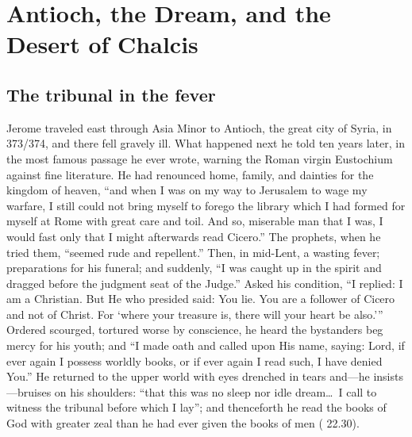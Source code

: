 \section{Antioch, the Dream, and the Desert of Chalcis}

\subsection{The tribunal in the fever}

Jerome traveled east through Asia Minor to Antioch, the great city of Syria,
in 373/374, and there fell gravely ill. What happened next he told ten years
later, in the most famous passage he ever wrote, warning the Roman virgin
Eustochium against fine literature. He had renounced home, family, and
dainties for the kingdom of heaven, ``and when I was on my way to Jerusalem to
wage my warfare, I still could not bring myself to forego the library which I
had formed for myself at Rome with great care and toil. And so, miserable man
that I was, I would fast only that I might afterwards read Cicero.'' The
prophets, when he tried them, ``seemed rude and repellent.'' Then, in
mid-Lent, a wasting fever; preparations for his funeral; and suddenly, ``I was
caught up in the spirit and dragged before the judgment seat of the Judge.''
Asked his condition, ``I replied: I am a Christian. But He who presided said:
You lie. You are a follower of Cicero and not of Christ. For `where your
treasure is, there will your heart be also.''' Ordered scourged, tortured
worse by conscience, he heard the bystanders beg mercy for his youth; and ``I
made oath and called upon His name, saying: Lord, if ever again I possess
worldly books, or if ever again I read such, I have denied You.'' He returned
to the upper world with eyes drenched in tears and---he insists---bruises on
his shoulders: ``that this was no sleep nor idle dream\ldots\ I call to
witness the tribunal before which I lay''; and thenceforth he read the books
of God with greater zeal than he had ever given the books of men (
22.30).


